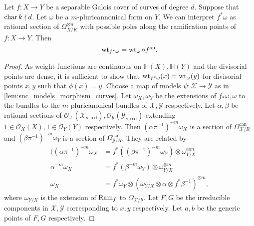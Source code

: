 \begin{theorem}\label{prop:weightfunction_fullback}
	Let $f: X \to Y$ be a separable Galois cover of curves of degree $d$. 
	Suppose that $\operatorname{char} k \nmid d$. 
	Let $\omega $ be a $m$-pluricannonical form on $Y$. 
	We can interpret $f^*\omega$ as rational section of $\Omega_{X / K}^{\otimes n}$ with possible poles along the ramification points of $f: X \to Y$. 
	Then \[
		\operatorname{wt}_{f^*\omega} = \operatorname{wt}_{\omega} \circ f{}^{\text{an}}
	.\] 
\end{theorem}
\begin{proof}
	As weight functions are continuous on $\mathbb{H}(X), \mathbb{H}(Y)$ and the divisorial points are dense, it is sufficient to show that $\operatorname{wt}_{f^* \omega}(x) = \operatorname{wt}_{\omega}(y)$ 
	for divisorial points  $x, y$ such that $\phi(x) = y$. 
	Choose a map of models $\psi: \mathscr X \to \mathscr Y$ as in \cref{lem:snc_models_morphism_curves}.  
	Let $\omega_X, \omega_Y$ be the extensions of $f_*\omega, \omega$ to the bundles to the $m$-pluricanonical bundles of $\mathscr X, \mathscr Y$ respectively. 
	Let $\alpha, \beta$ be rational sections of $\mathcal{O}_{\mathscr X}(\mathscr X_{s, \text{red}}), \mathcal{O}_{\mathscr Y}(\mathscr Y_{s, \text{red}} )$ extending $1 \in \mathcal{O}_X(X), 1 \in \mathcal{O}_Y(Y)$ respectively. 
	Then $(\alpha \pi^{-1})^{-m}\omega_{X}$ is a section of $\Omega^{\text{can}}_{\mathscr X / R}$ and $(\beta\pi^{-1})^{-m} \omega_{Y}$ is a section of $\Omega^{\text{can}}_{\mathscr Y / R}$. 
	They are related by \begin{align*}
		((\alpha \pi^{-1})^{-m} \omega_X &= f^*((\beta \pi^{-1})^{-m}\omega_Y) \otimes \omega_{Y / X}^{\otimes m} \\
		\alpha ^{-m} \omega_X &= f^*(\beta ^{-m}\omega_Y) \otimes \omega_{Y / X}^{\otimes m} \\
		\omega_{X} &= f^* \omega_{Y} \otimes (\omega_{Y / X} \otimes \alpha \otimes f^*\beta ^{-1})^{\otimes m}
	,\end{align*} 
	where $\omega_{ Y /  X}$ is the extension of $\operatorname{Ram}_f$ to $\Omega_{\mathscr X / \mathscr Y}$.
	Let $F, G$ be the irreducible components in $\mathscr X, \mathscr Y$ corresponding to $x, y$ respectively. 
	Let $a, b$ be the generic points of $F, G$ respectively. 


\end{proof}
